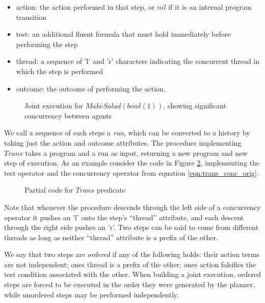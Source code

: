 \begin{itemize}
\item action: the action performed in that step, or $nil$ if it is an internal
program transition 
\item test: an additional fluent formula that must hold immediately before
performing the step 
\item thread: a sequence of 'l' and 'r' characters indicating the concurrent
thread in which the step is performed 
\item outcome: the outcome of performing the action. 
\end{itemize}
%
\begin{figure}

\caption{ Joint execution for $MakeSalad(bowl(1))$, showing significant concurrency
between agents }


\label{fig:plan-output} 
\end{figure}


We call a sequence of such steps a \emph{run}, which can be converted
to a history by taking just the action and outcome attributes. The
procedure implementing $Trans$ takes a program and a run as input,
returning a new program and new step of execution. As an example consider
the code in Figure \ref{fig:trans-code}, implementing the test operator
and the concurrency operator from equation \ref{eqn:trans_conc_orig}.

%
\begin{figure}

\caption{ Partial code for $Trans$ predicate }


\label{fig:trans-code} 
\end{figure}


Note that whenever the procedure descends through the left side of
a concurrency operator it pushes an 'l' onto the step's {}``thread''
attribute, and each descent through the right side pushes an 'r'.
Two steps can be said to come from different threads as long as neither
{}``thread'' attribute is a prefix of the other.

We say that two steps are \emph{ordered} if any of the following holds:
their action terms are not independent; ones thread is a prefix of
the other; ones action falsifies the test condition associated with
the other. When building a joint execution, ordered steps are forced
to be executed in the order they were generated by the planner, while
unordered steps may be performed independently.


